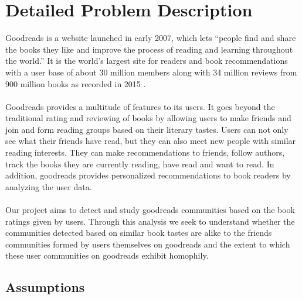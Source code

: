 \documentclass[11pt]{article}
\begin{document}
\maketitle

\section{Detailed Problem Description}
Goodreads is a website launched in early 2007, which lets ``people find and share the books they like and improve the process of reading and learning throughout the world.'' It is the world's largest site for readers and book recommendations with a user base of about 30 million members along with 34 million reviews from 900 million books as recorded in 2015 \cite{goodreads:aboutus}.\\\\
Goodreads provides a multitude of features to its users. It goes beyond the traditional rating and reviewing of books by allowing users to make friends and join and form reading groups based on their literary tastes.
Users can not only see what their friends have read, but they can also meet new people with similar reading interests. They can make recommendations to friends, follow authors, track the books they are currently reading, have read and want to read. In addition, goodreads provides personalized recommendations to book readers by analyzing the user data.\\\\
Our project aims  to detect and study goodreads communities based on the book ratings given by users. Through this analysis we seek to understand whether the communities detected based on similar book tastes are alike to the friends communities formed by users themselves on goodreads and the extent to which these user communities on goodreads exhibit homophily.

\subsection{Assumptions}


\end{document}
